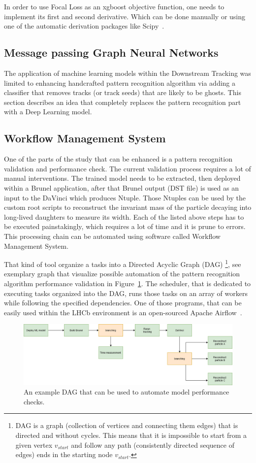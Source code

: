 In order to use Focal Loss as an xgboost objective function, one needs to implement its first and second derivative. Which can be done manually or using one of the automatic derivation packages like Scipy~\cite{scipy}.  


\subsection{Message passing Graph Neural Networks}

The application of machine learning models within the Downstream Tracking was limited to enhancing handcrafted pattern recognition algorithm via adding a classifier that removes tracks (or track seeds) that are likely to be ghosts. This section describes an idea that completely replaces the pattern recognition part with a Deep Learning model.

\subsection{Workflow Management System}

One of the parts of the study that can be enhanced is a pattern recognition validation and performance check. 
The current validation process requires a lot of manual interventions. The trained model needs to be extracted, then deployed within a Brunel application, after that Brunel output (DST file) is used as an input to the DaVinci which produces Ntuple. Those Ntuples can be used by the custom root scripts to reconstruct the invariant mass of the particle decaying into long-lived daughters to measure its width. Each of the listed above steps has to be executed painstakingly, which requires a lot of time and it is prune to errors. This processing chain can be automated using software called Workflow Management System. 

That kind of tool organize a tasks into a Directed Acyclic Graph (DAG) \footnote{DAG is a graph (collection of vertices and connecting them edges) that is directed and without cycles. This means that it is impossible to start from a given vertex $v_{start}$ and follow any path (consistently directed sequence of edges) ends in the starting node $v_{start}$.}, see exemplary graph that visualize possible automation of the pattern recognition algorithm performance validation in Figure~\ref{fig:DAG}. The scheduler, that is dedicated to executing tasks organized into the DAG, runs those tasks on an array of workers while following the specified dependencies. One of those programs, that can be easily used within the LHCb environment is an open-sourced Apache Airflow~\cite{airflow}.


\begin{figure}[!h]
\centering
\includegraphics[scale=0.8]{figures/Upgrade_wokflow.png}
\caption{An example DAG that can be used to automate model performance checks. 
\label{fig:DAG}}
\end{figure}